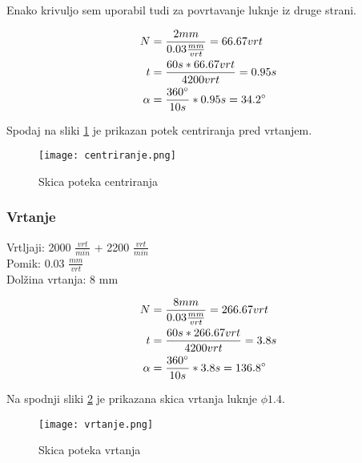         \noindent Enako krivuljo sem uporabil tudi za povrtavanje luknje iz druge strani.

        \begin{equation}
            \begin{split}
                N &= \frac{2 mm}{0.03 \frac{mm}{vrt}} = 66.67 vrt \\
                t &= \frac{60 s * 66.67 vrt}{4200 vrt} = 0.95 s \\
                \alpha &= \frac{360\degree}{10 s} * 0.95 s = 34.2 \degree \\
            \end{split}
        \end{equation}

        Spodaj na sliki \ref{centriranje} je prikazan potek
        centriranja pred vrtanjem.

        \begin{figure}[H]
            \begin{center}
                \texttt{[image: centriranje.png]}
                \caption{Skica poteka centriranja
                \cite{lasten}}
                \label{centriranje}
            \end{center}
        \end{figure}

        \newpage

    \subsubsection{Vrtanje}
        Vrtljaji: 2000 \( \frac{vrt}{min} \) + 2200 \( \frac{vrt}{min} \)\\
        Pomik: 0.03 \( \frac{mm}{vrt} \) \\
        Dolžina vrtanja: 8 mm

        \begin{equation}
            \begin{split}
                N &= \frac{8 mm}{0.03 \frac{mm}{vrt}} = 266.67 vrt \\
                t &= \frac{60 s * 266.67 vrt}{4200 vrt} = 3.8 s \\
                \alpha &= \frac{360\degree}{10 s} * 3.8 s = 136.8 \degree \\
            \end{split}
        \end{equation}

        Na spodnji sliki \ref{vrtanje} je prikazana skica vrtanja
        luknje $\phi 1.4$.
        \begin{figure}[H]
            \begin{center}
                \texttt{[image: vrtanje.png]}
                \caption{Skica poteka vrtanja
                \cite{lasten}}
                \label{vrtanje}
            \end{center}
        \end{figure}

